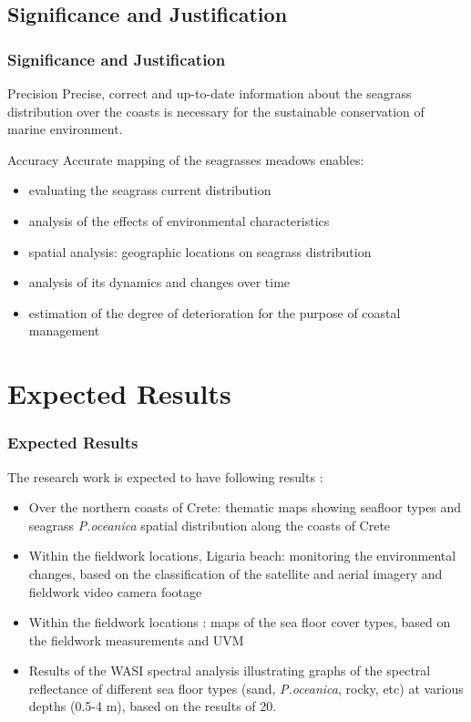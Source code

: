 \documentclass[pdflatex,compress,8pt,
	xcolor={dvipsnames,dvipsnames,svgnames,x11names,table},
	hyperref={colorlinks = true,breaklinks = true, urlcolor = NavyBlue, breaklinks = true}]{beamer}
\begin{document}
\subsection{Significance and Justification}
\begin{frame}\frametitle{Significance and Justification}

\begin{alertblock}{Precision}
Precise, correct and up-to-date information about the seagrass distribution over the coasts is necessary for the sustainable conservation of marine environment.
\end{alertblock}

\begin{block}{Accuracy}
Accurate mapping of the seagrasses meadows enables:
\begin{itemize}
	\item evaluating the seagrass current distribution
	\item analysis of the effects of environmental characteristics 
	\item spatial analysis: geographic locations on seagrass distribution
	\item analysis of its dynamics and changes over time
	\item estimation of the degree of deterioration for the purpose of coastal management
\end{itemize}
\end{block}
\end{frame}

\section{Expected Results}
\begin{frame}\frametitle{Expected Results}
The research work is expected to have following results :
\begin{itemize}
	\item Over the northern coasts of Crete: thematic maps showing seafloor types and seagrass \emph{P.oceanica} spatial distribution along the coasts of Crete
	\item Within the fieldwork locations, Ligaria beach: monitoring the environmental changes, based on the classification of the satellite and aerial imagery and fieldwork video camera footage
	\item Within the fieldwork locations : maps of the sea floor cover types, based on the fieldwork measurements and UVM
	\item Results of the WASI spectral analysis illustrating graphs of the spectral reflectance of different sea floor types (sand, \emph{P.oceanica}, rocky, etc) at various depths (0.5-4 m), based on the results of 20.
\end{itemize}
\end{frame}
\end{document}
